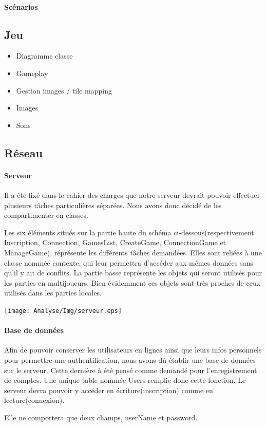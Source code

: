 	\paragraph{Scénarios}
			

\subsection{Jeu}
	\begin{itemize}
		\item{Diagramme classe}
		\item{Gameplay}
		\item{Gestion images / tile mapping}
		\item{Images}
		\item{Sons}
	\end{itemize}
			

\subsection{Réseau}
		
	\paragraph{Serveur\\}
			
		Il a été fixé dans le cahier des charges que notre serveur devrait pouvoir
		effectuer plusieurs tâches particulières séparées. Nous avons donc décidé de
		les compartimenter en classes.
			
		Les six éléments situés sur la partie haute du schéma
		ci-dessous(respectivement Inscription, Connection, GamesList, CreateGame,
		ConnectionGame et ManageGame), réprésente les différents tâches demandées.
		Elles sont reliées à une classe nommée contexte, qui leur permettra d'accéder
		aux mêmes données sans qu'il y ait de conflits. La partie basse représente les
		objets qui seront utilisés pour les parties en multijoueurs. Bien évidemment
		ces objets sont très proches de ceux utilisés dans les parties locales.
		
		\begin{center}
			\texttt{[image: Analyse/Img/serveur.eps]}
		\end{center}
		
	\paragraph{Base de données\\}
		Afin de pouvoir conserver les utilisateurs en lignes ainsi que leurs infos
		personnels pour permettre une authentification, nous avons dû établir une
		base de données sur le serveur. Cette dernière à été pensé comme demandé pour 
		l'enregistrement de comptes. Une unique table nommée Users remplie donc cette
		fonction. Le serveur devra pouvoir y accéder en écriture(inscription) comme
		en lecture(connexion).
			
		Elle ne comportera que deux champs, userName et password.